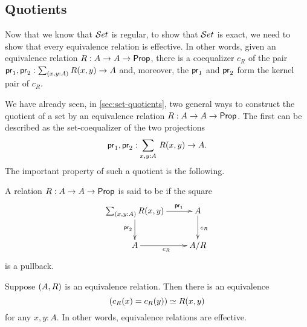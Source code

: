 \subsection{Quotients}\label{subsec:quotients}
Now that we know that $\mathcal{S}et$ is regular, to show that $\mathcal{S}et$ is exact, we need to show that every
equivalence relation is effective. In other words, given an equivalence
relation $R:A\to A\to\mathsf{Prop}$, there is a coequalizer $c_R$ of the pair
$\proj1,\proj2:\sm{x,y:A} R(x,y)\to A$ and, moreover, the $\mathsf{pr}_{1}$ and $\mathsf{pr}_{2}$
form the kernel pair of $c_R$.

We have already seen, in \autoref{sec:set-quotients}, two general ways to construct the quotient of a set by an equivalence relation $R:A\to A\to\mathsf{Prop}$.
The first can be described as the set-coequalizer of the two projections
\[\proj1,\proj2:\sm{x,y:A} R(x,y)\to A.\]
The important property of such a quotient is the following.

\begin{defn}
A relation $R:A\to A\to\mathsf{Prop}$ is said to be  if the square
\begin{equation*}
  \xymatrix{
    {\sm{x,y:A} R (x,y)}
    \ar[r]^(0.7){\proj1}
    \ar[d]_{\proj2}
    &
    {A}
    \ar[d]^{c_R}
    \\
    {A}
    \ar[r]_{c_R}
    &
    {A/R}
    }
\end{equation*}
is a pullback. 
\end{defn}

\begin{lem}\label{lem:sets_exact}
Suppose ${\mathopen{}(A,R)\mathclose{}}$ is an equivalence relation. Then there is an equivalence
\begin{equation*}
(c_R(x)= c_R(y))\simeq R(x,y)
\end{equation*}
for any $x,y:A$. In other words, equivalence relations are effective.
\end{lem}

